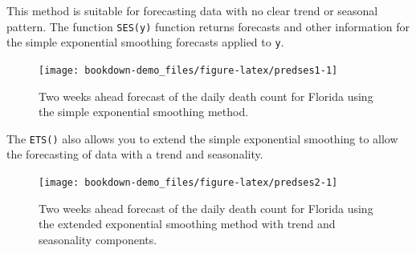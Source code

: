 \documentclass[]{book}
\newenvironment{Shaded}{\begin{snugshade}}{\end{snugshade}}
\newcommand{\KeywordTok}[1]{\textcolor[rgb]{0.13,0.29,0.53}{\textbf{#1}}}
\newcommand{\DataTypeTok}[1]{\textcolor[rgb]{0.13,0.29,0.53}{#1}}
\newcommand{\StringTok}[1]{\textcolor[rgb]{0.31,0.60,0.02}{#1}}
\newcommand{\OperatorTok}[1]{\textcolor[rgb]{0.81,0.36,0.00}{\textbf{#1}}}
\newcommand{\NormalTok}[1]{#1}
\begin{document}
This method is suitable for forecasting data with no clear trend or
seasonal pattern. The function \texttt{SES(y)} function returns
forecasts and other information for the simple exponential smoothing
forecasts applied to \texttt{y}.

\begin{Shaded}
\end{Shaded}

\begin{figure}

{\centering \texttt{[image: bookdown-demo\_files/figure-latex/predses1-1]} 

}

\caption{Two weeks ahead forecast of the daily death count for Florida using the simple exponential smoothing method.}\label{fig:predses1}
\end{figure}

The \texttt{ETS()} also allows you to extend the simple exponential
smoothing to allow the forecasting of data with a trend and seasonality.

\begin{Shaded}
\end{Shaded}

\begin{figure}

{\centering \texttt{[image: bookdown-demo\_files/figure-latex/predses2-1]} 

}

\caption{Two weeks ahead forecast of the daily death count for Florida using the extended exponential smoothing method with trend and seasonality components.}\label{fig:predses2}
\end{figure}
\end{document}
